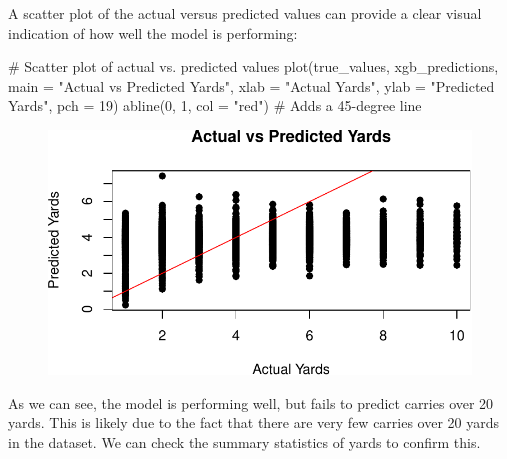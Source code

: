 \documentclass[
  super,
  preprint,
  3p]{elsarticle}
\newenvironment{Shaded}{\begin{snugshade}}{\end{snugshade}}
\newcommand{\AttributeTok}[1]{\textcolor[rgb]{0.40,0.45,0.13}{#1}}
\newcommand{\CommentTok}[1]{\textcolor[rgb]{0.37,0.37,0.37}{#1}}
\newcommand{\DecValTok}[1]{\textcolor[rgb]{0.68,0.00,0.00}{#1}}
\newcommand{\FunctionTok}[1]{\textcolor[rgb]{0.28,0.35,0.67}{#1}}
\newcommand{\NormalTok}[1]{\textcolor[rgb]{0.00,0.23,0.31}{#1}}
\newcommand{\SpecialCharTok}[1]{\textcolor[rgb]{0.37,0.37,0.37}{#1}}
\newcommand{\StringTok}[1]{\textcolor[rgb]{0.13,0.47,0.30}{#1}}
\begin{document}
A scatter plot of the actual versus predicted values can provide a clear
visual indication of how well the model is performing:

\begin{Shaded}
\begin{Highlighting}[]
\CommentTok{\# Scatter plot of actual vs. predicted values}
\FunctionTok{plot}\NormalTok{(true\_values, xgb\_predictions, }\AttributeTok{main =} \StringTok{"Actual vs Predicted Yards"}\NormalTok{, }\AttributeTok{xlab =} \StringTok{"Actual Yards"}\NormalTok{, }\AttributeTok{ylab =} \StringTok{"Predicted Yards"}\NormalTok{, }\AttributeTok{pch =} \DecValTok{19}\NormalTok{)}
\FunctionTok{abline}\NormalTok{(}\DecValTok{0}\NormalTok{, }\DecValTok{1}\NormalTok{, }\AttributeTok{col =} \StringTok{"red"}\NormalTok{)  }\CommentTok{\# Adds a 45{-}degree line}
\end{Highlighting}
\end{Shaded}

\begin{figure}[H]

{\centering \includegraphics{project_report_files/figure-pdf/unnamed-chunk-15-1.pdf}

}

\end{figure}

As we can see, the model is performing well, but fails to predict
carries over 20 yards. This is likely due to the fact that there are
very few carries over 20 yards in the dataset. We can check the summary
statistics of yards to confirm this.

\begin{Shaded}
\end{Shaded}
\end{document}
